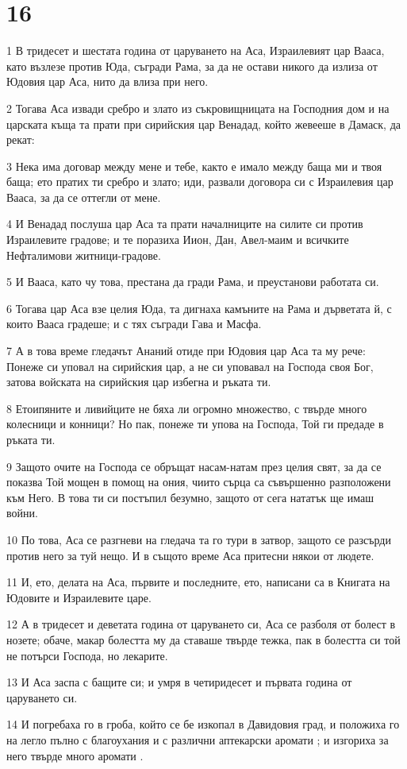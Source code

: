 \chapter{16}

\par 1 В тридесет и шестата година от царуването на Аса, Израилевият цар Вааса, като възлезе против Юда, съгради Рама, за да не остави никого да излиза от Юдовия цар Аса, нито да влиза при него.
\par 2 Тогава Аса извади сребро и злато из съкровищницата на Господния дом и на царската къща та прати при сирийския цар Венадад, който жевееше в Дамаск, да рекат:
\par 3 Нека има договар между мене и тебе, както е имало между баща ми и твоя баща; ето пратих ти сребро и злато; иди, развали договора си с Израилевия цар Вааса, за да се оттегли от мене.
\par 4 И Венадад послуша цар Аса та прати началниците на силите си против Израилевите градове; и те поразиха Иион, Дан, Авел-маим и всичките Нефталимови житници-градове.
\par 5 И Вааса, като чу това, престана да гради Рама, и преустанови работата си.
\par 6 Тогава цар Аса взе целия Юда, та дигнаха камъните на Рама и дърветата й, с които Вааса градеше; и с тях съгради Гава и Масфа.
\par 7 А в това време гледачът Ананий отиде при Юдовия цар Аса та му рече: Понеже си уповал на сирийския цар, а не си уповавал на Господа своя Бог, затова войската на сирийския цар избегна и ръката ти.
\par 8 Етоипяните и ливийците не бяха ли огромно множество, с твърде много колесници и конници? Но пак, понеже ти упова на Господа, Той ги предаде в ръката ти.
\par 9 Защото очите на Господа се обръщат насам-натам през целия свят, за да се показва Той мощен в помощ на ония, чиито сърца са съвършенно разположени към Него. В това ти си постъпил безумно, защото от сега нататък ще имаш войни.
\par 10 По това, Аса се разгневи на гледача та го тури в затвор, защото се разсърди против него за туй нещо. И в същото време Аса притесни някои от людете.
\par 11 И, ето, делата на Аса, първите и последните, ето, написани са в Книгата на Юдовите и Израилевите царе.
\par 12 А в тридесет и деветата година от царуването си, Аса се разболя от болест в нозете; обаче, макар болестта му да ставаше твърде тежка, пак в болестта си той не потърси Господа, но лекарите.
\par 13 И Аса заспа с бащите си; и умря в четиридесет и първата година от царуването си.
\par 14 И погребаха го в гроба, който се бе изкопал в Давидовия град, и положиха го на легло пълно с благоухания и с различни аптекарски аромати ; и изгориха за него твърде много аромати .

